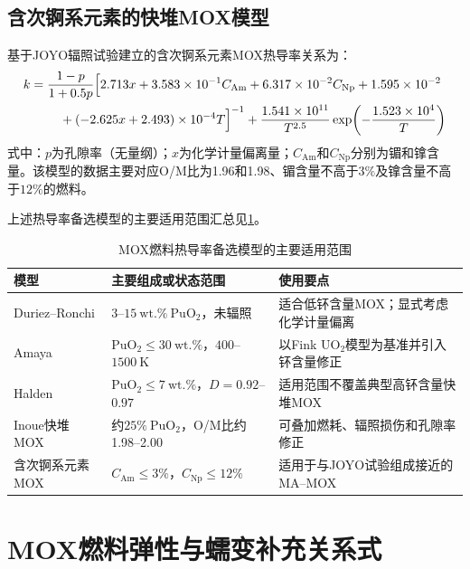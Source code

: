 \subsection{含次锕系元素的快堆MOX模型}

基于JOYO辐照试验建立的含次锕系元素MOX热导率关系为：
\begin{align}
	k={}&\frac{1-p}{1+0.5p}
	\Bigl[
	2.713x+3.583\times10^{-1}C_{\mathrm{Am}}
	+6.317\times10^{-2}C_{\mathrm{Np}}
	+1.595\times10^{-2}
	\notag\\
	&\quad
	+\left(-2.625x+2.493\right)\times10^{-4}T
	\Bigr]^{-1}
	+\frac{1.541\times10^{11}}{T^{2.5}}
	\exp\!\left(-\frac{1.523\times10^4}{T}\right)
	\label{eq:appendix_minor_actinide_mox_thermal_conductivity}
\end{align}
\noindent
 式中：$p$为孔隙率（无量纲）；$x$为化学计量偏离量；$C_{\mathrm{Am}}$和$C_{\mathrm{Np}}$分别为镅和镎含量。该模型的数据主要对应O/M比为1.96和1.98、镅含量不高于$3\%$及镎含量不高于$12\%$的燃料。

上述热导率备选模型的主要适用范围汇总见\tablename\ref{tab:appendix_mox_thermal_conductivity_scope}。

\begin{table}[htbp]
	\centering
	\renewcommand{\arraystretch}{1.20}
	\caption{MOX燃料热导率备选模型的主要适用范围}
	\label{tab:appendix_mox_thermal_conductivity_scope}
	\begin{tabularx}{\textwidth}{p{3.3cm}p{4.0cm}X}
		\toprule
		模型 & 主要组成或状态范围 & 使用要点 \\
		\midrule
		Duriez--Ronchi & $3$--$15\ \mathrm{wt.\%}\ \mathrm{PuO}_2$，未辐照 & 适合低钚含量MOX；显式考虑化学计量偏离 \\
		Amaya & $\mathrm{PuO}_2\leq30\ \mathrm{wt.\%}$，$400$--$1500\ \mathrm{K}$ & 以Fink $\mathrm{UO}_2$模型为基准并引入钚含量修正 \\
		Halden & $\mathrm{PuO}_2\leq7\ \mathrm{wt.\%}$，$D=0.92$--$0.97$ & 适用范围不覆盖典型高钚含量快堆MOX \\
		Inoue快堆MOX & 约$25\%\ \mathrm{PuO}_2$，O/M比约1.98--2.00 & 可叠加燃耗、辐照损伤和孔隙率修正 \\
		含次锕系元素MOX & $C_{\mathrm{Am}}\leq3\%$，$C_{\mathrm{Np}}\leq12\%$ & 适用于与JOYO试验组成接近的MA--MOX \\
		\bottomrule
	\end{tabularx}
\end{table}

\section{MOX燃料弹性与蠕变补充关系式}
\label{app:mox_mechanical_correlations}

